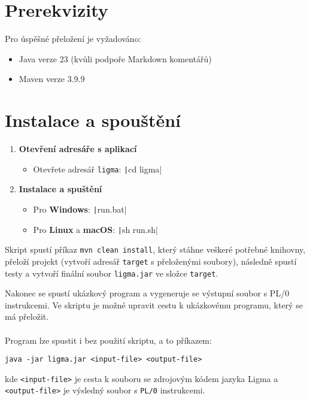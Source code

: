 \documentclass[czech, oth, kiv, he, iso690numb, viewonly]{fasthesis}
\begin{document}
    \section{Prerekvizity}

    Pro úspěšné přeložení je vyžadováno:
    \begin{itemize}
        \item Java verze 23 (kvůli podpoře Markdown komentářů)
        \item Maven verze 3.9.9
    \end{itemize}

    \section{Instalace a spouštění}

    \begin{enumerate}
        \item \textbf{Otevření adresáře s aplikací}
            \begin{itemize}
                \item Otevřete adresář \texttt{ligma}: \texttt|cd ligma|
            \end{itemize}
        \item \textbf{Instalace a spuštění}
            \begin{itemize}
                \item Pro \textbf{Windows}: \texttt|run.bat|
                \item Pro \textbf{Linux} a \textbf{macOS}: \texttt|sh run.sh|
            \end{itemize}
    \end{enumerate}
    Skript spustí příkaz \texttt{mvn clean install}, který stáhne veškeré potřebné knihovny, přeloží projekt (vytvoří adresář \texttt{target} s přeloženými soubory), následně spustí testy a vytvoří finální soubor \texttt{ligma.jar} ve složce \texttt{target}. 
    
    Nakonec se spustí ukázkový program a vygeneruje se výstupní soubor s PL/0 instrukcemi.
    Ve skriptu je možné upravit cestu k ukázkovému programu, který se má přeložit.
    \\\\
    Program lze spustit i bez použití skriptu, a to příkazem:
    \begin{verbatim}
java -jar ligma.jar <input-file> <output-file>
    \end{verbatim}
    kde \texttt{<input-file>} je cesta k souboru se zdrojovým kódem jazyka Ligma a \texttt{<output-file>} je výsledný soubor s \texttt{PL/0} instrukcemi.
\end{document}
